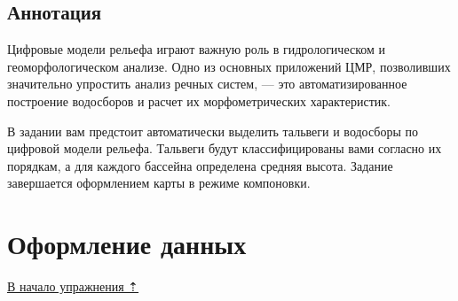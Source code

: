 \documentclass[]{book}
\theoremstyle{definition}
\theoremstyle{definition}
\theoremstyle{definition}
\theoremstyle{remark}
\begin{document}
\hypertarget{dem-annotation}{%
\subsection{Аннотация}\label{dem-annotation}}

Цифровые модели рельефа играют важную роль в гидрологическом и
геоморфологическом анализе. Одно из основных приложений ЦМР, позволивших
значительно упростить анализ речных систем, --- это автоматизированное
построение водосборов и расчет их морфометрических характеристик.

В задании вам предстоит автоматически выделить тальвеги и водосборы по
цифровой модели рельефа. Тальвеги будут классифицированы вами согласно
их порядкам, а для каждого бассейна определена средняя высота. Задание
завершается оформлением карты в режиме компоновки.

\hypertarget{dem-design}{%
\section{Оформление данных}\label{dem-design}}

\protect\hyperlink{dem-analysis}{В начало упражнения ⇡}
\end{document}
